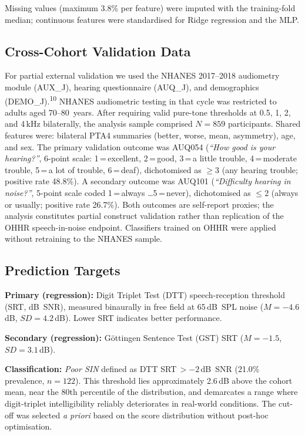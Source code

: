 \documentclass[12pt,a4paper]{article}
\begin{document}
Missing values (maximum 3.8\% per feature) were imputed with the
training-fold median; continuous features were standardised for Ridge
regression and the MLP.

\subsection{Cross-Cohort Validation Data}
\label{sec:nhanes}

For partial external validation we used the NHANES 2017--2018 audiometry
module (AUX\_J), hearing questionnaire (AUQ\_J), and demographics
(DEMO\_J).\textsuperscript{10}  NHANES audiometric testing in that cycle was
restricted to adults aged 70--80~years.  After requiring valid pure-tone
thresholds at 0.5, 1, 2, and 4\,kHz bilaterally, the analysis sample
comprised $N{=}859$ participants.  Shared features were: bilateral PTA4
summaries (better, worse, mean, asymmetry), age, and sex.  The primary
validation outcome was AUQ054 (\textit{``How good is your hearing?''},
6-point scale: 1\,=\,excellent, 2\,=\,good, 3\,=\,a little trouble,
4\,=\,moderate trouble, 5\,=\,a lot of trouble, 6\,=\,deaf), dichotomised
as $\geq$3 (any hearing trouble; positive rate 48.8\%).  A secondary outcome
was AUQ101 (\textit{``Difficulty hearing in noise?''}, 5-point scale coded
1\,=\,always \ldots 5\,=\,never), dichotomised as $\leq$2 (always or usually;
positive rate 26.7\%).  Both outcomes are self-report proxies; the analysis
constitutes partial construct validation rather than replication of the OHHR
speech-in-noise endpoint.  Classifiers trained on OHHR were applied without
retraining to the NHANES sample.

\subsection{Prediction Targets}

\textbf{Primary (regression):} Digit Triplet Test (DTT) speech-reception
threshold (SRT, dB~SNR), measured binaurally in free field at 65\,dB~SPL
noise ($M{=}-4.6$\,dB, $SD{=}4.2$\,dB).  Lower SRT indicates better
performance.

\textbf{Secondary (regression):} Göttingen Sentence Test (GST) SRT
($M{=}-1.5$, $SD{=}3.1$\,dB).

\textbf{Classification:} \textit{Poor SIN} defined as DTT
SRT\,${>}{-2}$\,dB~SNR (21.0\% prevalence, $n{=}122$).  This threshold lies
approximately 2.6\,dB above the cohort mean, near the 80th percentile of the
distribution, and demarcates a range where digit-triplet intelligibility
reliably deteriorates in real-world conditions.  The cut-off was selected
\emph{a priori} based on the score distribution without post-hoc optimisation.
\end{document}

